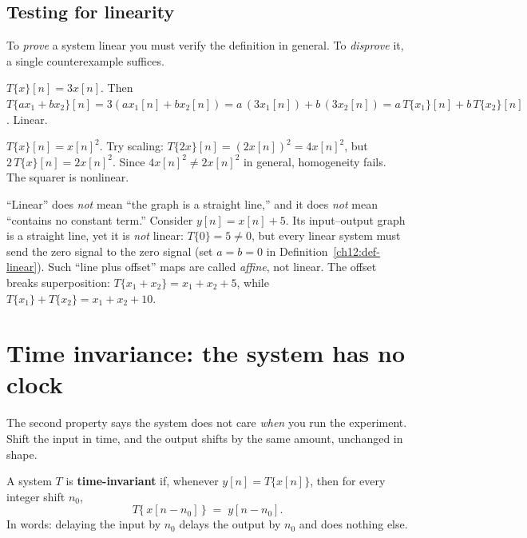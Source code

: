 \subsection*{Testing for linearity}

To \emph{prove} a system linear you must verify the definition in general. To
\emph{disprove} it, a single counterexample suffices.

\begin{example}
$T\{x\}[n] = 3x[n]$. Then
$T\{ax_1 + bx_2\}[n] = 3(ax_1[n] + bx_2[n]) = a\,(3x_1[n]) + b\,(3x_2[n])
= a\,T\{x_1\}[n] + b\,T\{x_2\}[n]$. Linear. \checkmark
\end{example}

\begin{example}
\label{ch12:squarer-nonlinear}
$T\{x\}[n] = x[n]^2$. Try scaling: $T\{2x\}[n] = (2x[n])^2 = 4x[n]^2$, but
$2\,T\{x\}[n] = 2x[n]^2$. Since $4x[n]^2 \neq 2x[n]^2$ in general, homogeneity
fails. The squarer is nonlinear.
\end{example}

\begin{trapbox}
``Linear'' does \emph{not} mean ``the graph is a straight line,'' and it does
\emph{not} mean ``contains no constant term.'' Consider $y[n] = x[n] + 5$. Its
input--output graph is a straight line, yet it is \emph{not} linear:
$T\{0\} = 5 \neq 0$, but every linear system must send the zero signal to the
zero signal (set $a=b=0$ in Definition~\ref{ch12:def-linear}). Such ``line plus
offset'' maps are called \emph{affine}, not linear. The offset breaks
superposition: $T\{x_1+x_2\} = x_1+x_2+5$, while $T\{x_1\}+T\{x_2\} =
x_1+x_2+10$.
\end{trapbox}

\section{Time invariance: the system has no clock}
\label{ch12:ti}

The second property says the system does not care \emph{when} you run the
experiment. Shift the input in time, and the output shifts by the same amount,
unchanged in shape.

\begin{definition}
\label{ch12:def-ti}
A system $T$ is \textbf{time-invariant} if, whenever $y[n] = T\{x[n]\}$, then for
every integer shift $n_0$,
\[
  T\{\,x[n - n_0]\,\} \;=\; y[n - n_0].
\]
In words: delaying the input by $n_0$ delays the output by $n_0$ and does nothing
else.
\end{definition}

